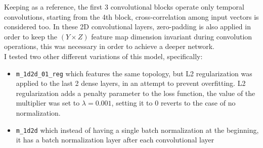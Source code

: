 \begin{table*}[]
\captionsetup{font=scriptsize, justification=centering}
\centering
{}
\caption{\texttt{m_1d2d_01} model representation. Each \texttt{Conv} layer is made of (i) a convolution layer and (ii) a ReLU activation, stride is set to (1x1). \texttt{BN} stands for batch normalization. \texttt{D} represents a dropout layer and the number beneath is the percentage of elements that will be set to zero. \texttt{MP} stands for max pooling. \texttt{Flat} concatenates all the feature map values of the previous layer. Dense is a fully connected layer. \texttt{X@($Y \times Z$)} indicates the number of kernels, $X$, and the size of the kernel matrix, $Y \times Z$.}
\label{m_1d2d_table}
\end{table*}

Keeping  as a reference, the first 3 convolutional blocks operate only temporal convolutions, starting from the 4th block, \mbox{cross-correlation} among input vectors is considered too. In these 2D convolutional layers, \mbox{zero-padding} is also applied in order to keep the $(Y \times Z)$ feature map dimension invariant during convolution operations, this was necessary in order to achieve a deeper network.\\

I tested two other different variations of this model, specifically:
\begin{itemize}
\item \texttt{m_1d2d_01_reg} which features the same topology, but L2 regularization was applied to the last 2 dense layers, in an attempt to prevent overfitting. L2 regularization adds a penalty parameter to the loss function, the value of the multiplier was set to $\lambda=0.001$, setting it to 0 reverts to the case of no normalization.
\item \texttt{m_1d2d} which instead of having a single batch normalization at the beginning, it has a batch normalization layer after each convolutional layer
\end{itemize}

